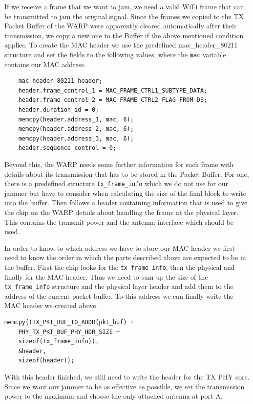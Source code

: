 \documentclass[sigconf]{acmart}
\begin{document}
If we receive a frame that we want to jam, we need a valid WiFi frame that can be transmitted to jam
the original signal. Since the frames we copied to the TX Packet Buffer of the WARP were apparently
cleared automatically after their transmission, we copy a new one to the Buffer if the above mentioned
condition applies. To create the MAC header we use the predefined mac\_header\_80211 structure
and set the fields to the following values, where the \texttt{mac} variable contains our MAC address.

\begin{verbatim}
	mac_header_80211 header;
	header.frame_control_1 = MAC_FRAME_CTRL1_SUBTYPE_DATA;
	header.frame_control_2 = MAC_FRAME_CTRL2_FLAG_FROM_DS;
	header.duration_id = 0;
	memcpy(header.address_1, mac, 6);
	memcpy(header.address_2, mac, 6);
	memcpy(header.address_3, mac, 6);
	header.sequence_control = 0;
\end{verbatim}

Beyond this, the WARP needs some further information for each frame with details about its transmission
that has to be stored in the Packet Buffer. For one, there is a predefined structure \texttt{tx\_frame\_info} which
we do not use for our jammer but have to consider when calculating the size of the final block to write into the
buffer. Then follows a header containing information that is used to give the chip on the WARP details about
handling the frame at the physical layer. This contains the transmit power and the antenna interface which
should be used.

In order to know to which address we have to store our MAC header we first need to know the order in which
the parts described above are expected to be in the buffer. First the chip looks for the
\texttt{tx\_frame\_info}, then the physical and finally for the MAC header. Thus we need to sum up the size of
the \texttt{tx\_frame\_info} structure and the physical layer header and add them to the address of the current
packet buffer. To this address we can finally write the MAC header we created above.

\begin{verbatim}
memcpy((TX_PKT_BUF_TO_ADDR(pkt_buf) + 
    PHY_TX_PKT_BUF_PHY_HDR_SIZE + 
    sizeof(tx_frame_info)), 
    &header, 
    sizeof(header));
\end{verbatim}

With this header finished, we still need to write the header for the TX PHY core. Since we want our jammer to
be as effective as possible, we set the transmission power to the maximum and choose the only attached
antenna at port A.
\end{document}
